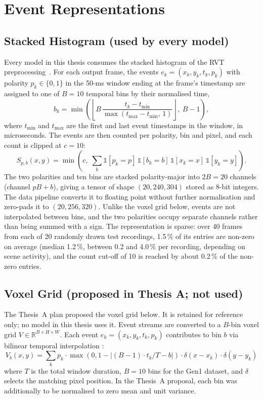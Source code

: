 \documentclass[11pt, a4paper]{report}
\begin{document}
\section{Event Representations}
\subsection{Stacked Histogram (used by every model)}
\label{subsec:stacked_hist}
Every model in this thesis consumes the stacked histogram of the RVT preprocessing~\cite{gehrig2023recurrent}.
For each output frame, the events $e_k=(x_k,y_k,t_k,p_k)$ with polarity $p_k\in\{0,1\}$ in the 50-ms window
ending at the frame's timestamp are assigned to one of $B=10$ temporal bins by their normalised time,
\begin{equation}
  b_k = \min\!\left(\left\lfloor B\,\frac{t_k - t_{\min}}{\max(t_{\max}-t_{\min},\,1)}\right\rfloor,\; B-1\right),
  \label{eq:sh_bin}
\end{equation}
where $t_{\min}$ and $t_{\max}$ are the first and last event timestamps in the window, in microseconds. The
events are then counted per polarity, bin and pixel, and each count is clipped at $c=10$:
\begin{equation}
  S_{p,b}(x,y) = \min\!\left(c,\; \sum_k \mathbb{1}[p_k=p]\,\mathbb{1}[b_k=b]\,\mathbb{1}[x_k=x]\,\mathbb{1}[y_k=y]\right).
  \label{eq:sh_count}
\end{equation}
The two polarities and ten bins are stacked polarity-major into $2B=20$ channels (channel $pB+b$), giving
a tensor of shape $(20,240,304)$ stored as 8-bit integers. The data pipeline converts it to floating point
without further normalisation and zero-pads it to $(20,256,320)$. Unlike the voxel grid below, events are
not interpolated between bins, and the two polarities occupy separate channels rather than being summed
with a sign. The representation is sparse: over 40 frames from each of 20 randomly drawn test recordings,
1.5\,\% of its entries are non-zero on average (median 1.2\,\%, between 0.2 and 4.0\,\% per recording,
depending on scene activity), and the count cut-off of 10 is reached by about 0.2\,\% of the non-zero entries.

\subsection{Voxel Grid (proposed in Thesis A; not used)}
The Thesis~A plan proposed the voxel grid below. It is retained for reference only; no model in this
thesis uses it.
Event streams are converted to a $B$-bin voxel grid $V \in \mathbb{R}^{B \times H \times W}$. Each event $e_k = (x_k, y_k, t_k, p_k)$ contributes to bin $b$ via bilinear temporal interpolation \cite{zhu2019unsupervised}:
\begin{equation}
    V_b(x, y) = \sum_k p_k \cdot \max(0, 1 - |(B-1) \cdot t_k / T - b|) \cdot \delta(x-x_k) \cdot \delta(y-y_k)
\end{equation}
where $T$ is the total window duration, $B=10$ bins for the Gen1 dataset, and $\delta$ selects the matching pixel position. In the Thesis~A proposal, each bin was additionally to be normalised to zero mean and unit variance.
\end{document}
